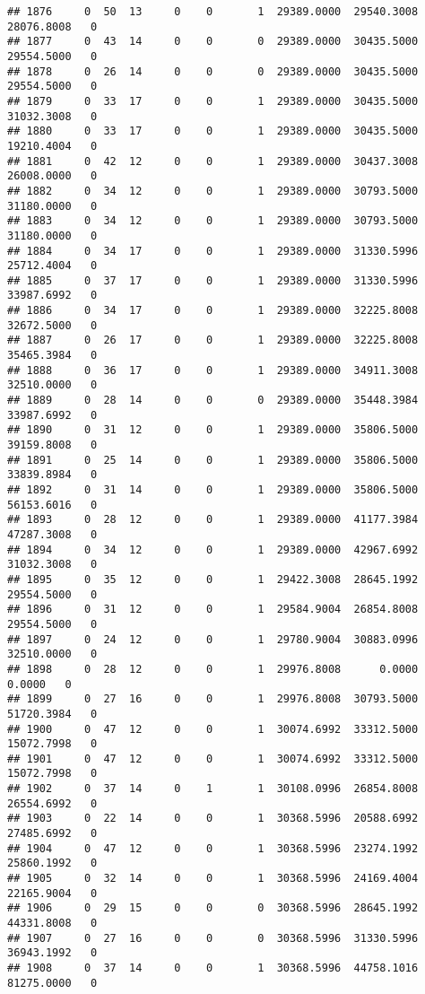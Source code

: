 \documentclass[
]{article}
\begin{document}
\begin{enumerate}
\begin{verbatim}
## 1876     0  50  13     0    0       1  29389.0000  29540.3008  28076.8008   0
## 1877     0  43  14     0    0       0  29389.0000  30435.5000  29554.5000   0
## 1878     0  26  14     0    0       0  29389.0000  30435.5000  29554.5000   0
## 1879     0  33  17     0    0       1  29389.0000  30435.5000  31032.3008   0
## 1880     0  33  17     0    0       1  29389.0000  30435.5000  19210.4004   0
## 1881     0  42  12     0    0       1  29389.0000  30437.3008  26008.0000   0
## 1882     0  34  12     0    0       1  29389.0000  30793.5000  31180.0000   0
## 1883     0  34  12     0    0       1  29389.0000  30793.5000  31180.0000   0
## 1884     0  34  17     0    0       1  29389.0000  31330.5996  25712.4004   0
## 1885     0  37  17     0    0       1  29389.0000  31330.5996  33987.6992   0
## 1886     0  34  17     0    0       1  29389.0000  32225.8008  32672.5000   0
## 1887     0  26  17     0    0       1  29389.0000  32225.8008  35465.3984   0
## 1888     0  36  17     0    0       1  29389.0000  34911.3008  32510.0000   0
## 1889     0  28  14     0    0       0  29389.0000  35448.3984  33987.6992   0
## 1890     0  31  12     0    0       1  29389.0000  35806.5000  39159.8008   0
## 1891     0  25  14     0    0       1  29389.0000  35806.5000  33839.8984   0
## 1892     0  31  14     0    0       1  29389.0000  35806.5000  56153.6016   0
## 1893     0  28  12     0    0       1  29389.0000  41177.3984  47287.3008   0
## 1894     0  34  12     0    0       1  29389.0000  42967.6992  31032.3008   0
## 1895     0  35  12     0    0       1  29422.3008  28645.1992  29554.5000   0
## 1896     0  31  12     0    0       1  29584.9004  26854.8008  29554.5000   0
## 1897     0  24  12     0    0       1  29780.9004  30883.0996  32510.0000   0
## 1898     0  28  12     0    0       1  29976.8008      0.0000      0.0000   0
## 1899     0  27  16     0    0       1  29976.8008  30793.5000  51720.3984   0
## 1900     0  47  12     0    0       1  30074.6992  33312.5000  15072.7998   0
## 1901     0  47  12     0    0       1  30074.6992  33312.5000  15072.7998   0
## 1902     0  37  14     0    1       1  30108.0996  26854.8008  26554.6992   0
## 1903     0  22  14     0    0       1  30368.5996  20588.6992  27485.6992   0
## 1904     0  47  12     0    0       1  30368.5996  23274.1992  25860.1992   0
## 1905     0  32  14     0    0       1  30368.5996  24169.4004  22165.9004   0
## 1906     0  29  15     0    0       0  30368.5996  28645.1992  44331.8008   0
## 1907     0  27  16     0    0       0  30368.5996  31330.5996  36943.1992   0
## 1908     0  37  14     0    0       1  30368.5996  44758.1016  81275.0000   0

\end{verbatim}
\end{enumerate}
\end{document}
